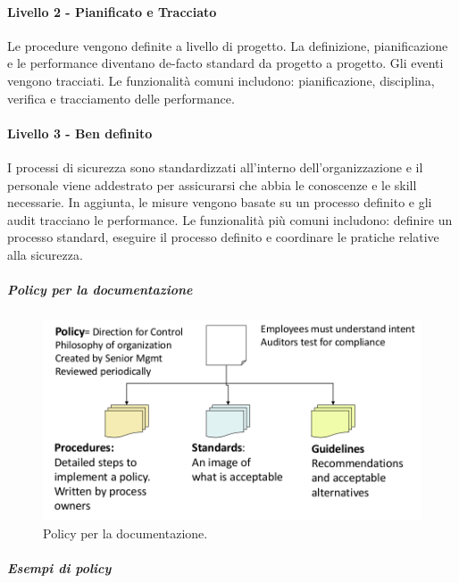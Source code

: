 \paragraph{Livello 2 - Pianificato e Tracciato}

Le procedure vengono definite a livello di progetto. La definizione, pianificazione 
e le performance diventano de-facto standard da progetto a progetto. Gli eventi 
vengono tracciati. Le funzionalità comuni includono: pianificazione, disciplina, 
verifica e tracciamento delle performance.

\paragraph{Livello 3 - Ben definito}

I processi di sicurezza sono standardizzati all'interno dell'organizzazione e il 
personale viene addestrato per assicurarsi che abbia le conoscenze e le skill 
necessarie. In aggiunta, le misure vengono basate su un processo definito e gli 
audit tracciano le performance. Le funzionalità più comuni includono: definire 
un processo standard, eseguire il processo definito e coordinare le pratiche 
relative alla sicurezza.

\subparagraph*{Policy per la documentazione}

\begin{figure}[h!]
        \begin{center}
                \includegraphics[scale=0.4]{res/img/documentation_policy}
        \end{center}
        \caption{Policy per la documentazione.}
\end{figure}

\subparagraph{Esempi di policy}

